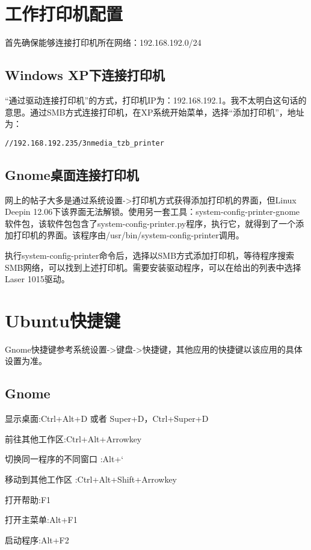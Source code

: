 \section{工作打印机配置}
首先确保能够连接打印机所在网络：192.168.192.0/24

\subsection{Windows XP下连接打印机}

“通过驱动连接打印机”的方式，打印机IP为：192.168.192.1。我不太明白这句话的意思。通过SMB方式连接打印机，在XP系统开始菜单，选择“添加打印机”，地址为：
\begin{verbatim}
//192.168.192.235/3nmedia_tzb_printer
\end{verbatim}

\subsection{Gnome桌面连接打印机}
网上的帖子大多是通过系统设置->打印机方式获得添加打印机的界面，但Linux Deepin 12.06下该界面无法解锁。使用另一套工具：system-config-printer-gnome软件包，该软件包包含了system-config-printer.py程序，执行它，就得到了一个添加打印机的界面。该程序由/usr/bin/system-config-printer调用。

执行system-config-printer命令后，选择以SMB方式添加打印机，等待程序搜索SMB网络，可以找到上述打印机。需要安装驱动程序，可以在给出的列表中选择Laser 1015驱动。



\section{Ubuntu快捷键}

Gnome快捷键参考系统设置->键盘->快捷键，其他应用的快捷键以该应用的具体设置为准。

\subsection{Gnome}

显示桌面:Ctrl+Alt+D 或者 Super+D，Ctrl+Super+D

前往其他工作区:Ctrl+Alt+Arrowkey

切换同一程序的不同窗口 :Alt+`

移动到其他工作区 :Ctrl+Alt+Shift+Arrowkey

打开帮助:F1

打开主菜单:Alt+F1

启动程序:Alt+F2

